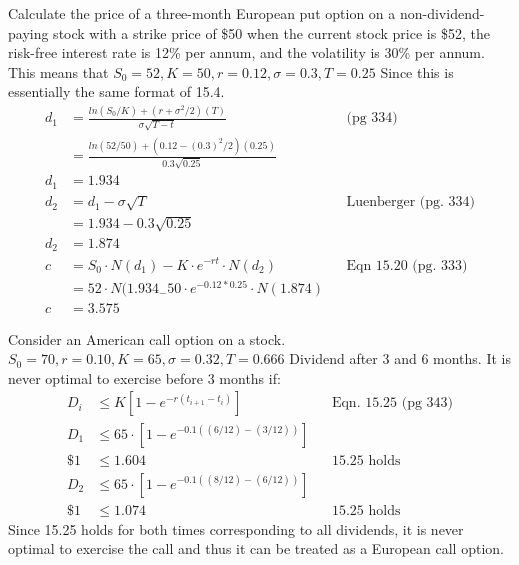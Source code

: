 \documentclass[12pt]{article}
\newenvironment{problem}[3][Problem]{\begin{trivlist}
\item[\hskip \labelsep {\bfseries #1}\hskip \labelsep {\bfseries #2.}]}{\end{trivlist}}
\begin{document}
\begin{problem}{15.13}. Calculate the price of a three-month European put option on a non-dividend-paying stock
with a strike price of \$50 when the current stock price is \$52, the risk-free interest rate is
12\% per annum, and the volatility is 30\% per annum. This means that $S_0=52, K=50, r=0.12, \sigma = 0.3, T=0.25$ Since this is essentially the same format of 15.4. 
\begin{align*}
d_1 &= \frac{ln(S_0/K) + (r+\sigma^2/2)(T)}{\sigma \sqrt{T-t}}  && \text{(pg 334)} \\
 &= \frac{ln(52/50) + (0.12-(0.3)^2/2)(0.25)}{0.3 \sqrt{0.25}}  \\
d_1 &= 1.934 \\
d_2 &= d_1 - \sigma \sqrt{T} && \text{Luenberger (pg. 334)}\\
&= 1.934 - 0.3 \sqrt{0.25} \\
d_2 &= 1.874 \\
c &= S_0\cdot N(d_1) - K\cdot e^{-rt} \cdot N(d_2) && \text{Eqn 15.20 (pg. 333)} \\
&= 52 \cdot N(1.934_ - 50 \cdot e^{-0.12*0.25} \cdot N(1.874) \\
c &= 3.575
\end{align*}
\end{problem}

\begin{problem}{15.15}. Consider an American call option on a stock. $S_0 = 70, r= 0.10, K=65, \sigma = 0.32, T=0.666$ Dividend after 3 and 6 months. 
It is never optimal to exercise before 3 months if:
\begin{align*}
D_i &\leq K[1-e^{-r(t_{i+1}-t_i)}] && \text{Eqn. 15.25 (pg 343)} \\
D_1 &\leq 65\cdot [1-e^{-0.1((6/12)-(3/12))}] \\
\$ 1  &\leq 1.604 &&\text{15.25 holds} \\
D_2 &\leq 65\cdot [1-e^{-0.1((8/12)-(6/12))}] \\
\$ 1 &\leq 1.074 &&\text{15.25 holds}
\end{align*}
Since 15.25 holds for both times corresponding to all dividends, it is never optimal to exercise the call and thus it can be treated as a European call option. 
\end{problem}
\end{document}
